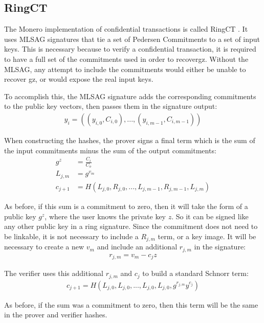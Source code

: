 \documentclass{article}
\begin{document}
\subsection{RingCT}

The Monero implementation of confidential transactions is called RingCT \cite{ringct}.  It uses MLSAG signatures that tie a set of Pedersen Commitments to a set of input keys.  This is necessary because to verify a confidential transaction, it is required to have a full set of the commitments used in order to recovergz.  Without the MLSAG, any attempt to include the commitments would either be unable to recover gz, or would expose the real input keys.

To accomplish this, the MLSAG signature adds the corresponding commitments to the public key vectors, then passes them in the signature output:
\begin{align}
  y_i = ((y_{i,0}, C_{i,0}), ..., (y_{i,m-1}, C_{i,m-1}))
\end{align}

When constructing the hashes, the prover signs a final term which is the sum of the input commitments minus the sum of the output commitments:
\begin{align}
  g^z &= \frac{C_i}{C_o}\\
  L_{j,m} &= g^{v_m}\\
  c_{j+1} &= H(L_{j,0}, R_{j,0}, ... , L_{j,m-1}, R_{j, m-1}, L_{j,m})
\end{align}

As before, if this sum is a commitment to zero, then it will take the form of a public key $g^z$, where the user knows the private key $z$.  So it can be signed like any other public key in a ring signature.  Since the commitment does not need to be linkable, it is not necessary to include a $R_{j,m}$ term, or a key image.  It will be necessary to create a new $v_m$ and include an additional $r_{j,m}$ in the signature:
\begin{align}
  r_{j,m} = v_m - c_j z
\end{align}

The verifier uses this additional $r_{j,m}$ and $c_j$ to build a standard Schnorr term:
\begin{align}
  c_{j+1} = H(L_{j,0}, L_{j,0}, ... , L_{j,0}, L_{j,0}, g^{r_{j,m}} y^{c_j})
\end{align}

As before, if the sum was a commitment to zero, then this term will be the same in the prover and verifier hashes.
\end{document}
